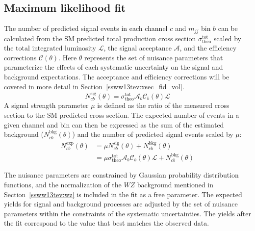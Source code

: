 \subsection{Maximum likelihood fit}\label{ssww13tev:xsec_fit_method}
The number of predicted signal events in each channel $c$ and $m_{jj}$ bin $b$ can be calculated from the SM predicted total production cross section $\sigma^{\textrm{tot}}_{\textrm{theo}}$ scaled by the total integrated luminosity $\mathcal{L}$, the signal acceptance $\mathcal{A}$, and the efficiency corrections $\mathcal{C}(\theta)$.
Here $\theta$ represents the set of nuisance parameters that parameterize the effects of each systematic uncertainty on the signal and background expectations.
The acceptance and efficiency corrections will be covered in more detail in Section~\ref{ssww13tev:xsec_fid_vol}.
\begin{equation}
  N_{cb}^{\textrm{sig}}(\theta) = \sigma^{\textrm{tot}}_{\textrm{theo}}\mathcal{A}_b\mathcal{C}_{b}(\theta)\mathcal{L}
  \label{eq:ssww13tev_xsec_nsig}
\end{equation}
A signal strength parameter $\mu$ is defined as the ratio of the measured cross section to the SM predicted cross section.
The expected number of events in a given channel and bin can then be expressed as the sum of the estimated background ($N_{cb}^{\textrm{bkg}}(\theta)$) and the number of predicted signal events scaled by $\mu$:
\begin{equation}
  \begin{aligned}
    N_{cb}^{\textrm{exp}}(\theta) &= \mu N_{cb}^{\textrm{sig}}(\theta) + N_{cb}^{\textrm{bkg}}(\theta) \\
                              &= \mu \sigma^{\textrm{tot}}_{\textrm{theo}}\mathcal{A}_b\mathcal{C}_{b}(\theta)\mathcal{L} + N_{cb}^{\textrm{bkg}}(\theta)
  \end{aligned}
  \label{eq:ssww13tev_xsec_nexp}
\end{equation}

The nuisance parameters are constrained by Gaussian probability distribution functions, and the normalization of the $WZ$ background mentioned in Section~\ref{ssww13tev:wz} is included in the fit as a free parameter.
The expected yields for signal and background processes are adjusted by the set of nuisance parameters within the constraints of the systematic uncertainties.
The yields after the fit correspond to the value that best matches the observed data.

